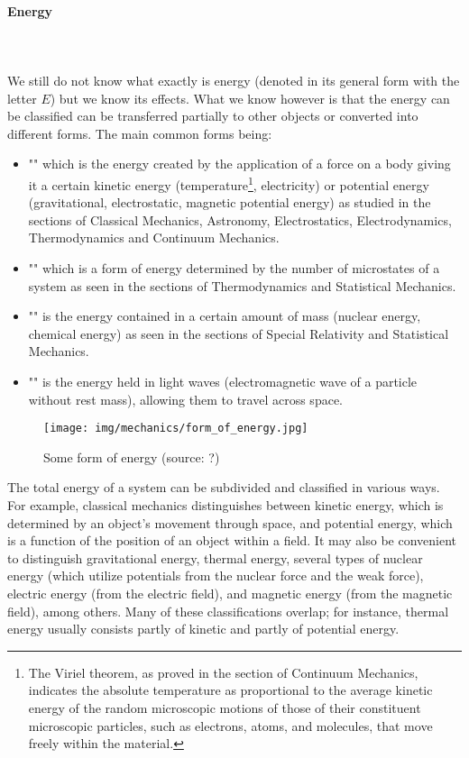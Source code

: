 	\pagebreak
	\paragraph{Energy}\mbox{}\\\\
	We still do not know what exactly is energy (denoted in its general form with the letter $E$) but we know its effects. What we know however is that the energy can be classified can be transferred partially to other objects or converted into different forms. The main common forms being:
	\begin{itemize}
		\item "" which is the energy created by the application of a force on a body giving it a certain kinetic energy (temperature\footnote{The Viriel theorem, as proved in the section of Continuum Mechanics, indicates the absolute temperature as proportional to the average kinetic energy of the random microscopic motions of those of their constituent microscopic particles, such as electrons, atoms, and molecules, that move freely within the material.}, electricity) or potential energy (gravitational, electrostatic, magnetic potential energy) as studied in the sections of Classical Mechanics, Astronomy, Electrostatics, Electrodynamics, Thermodynamics and Continuum Mechanics.

		\item "" which is a form of energy determined by the number of microstates of a system as seen in the sections of Thermodynamics and Statistical Mechanics.

		\item "" is the energy contained in a certain amount of mass (nuclear energy, chemical energy) as seen in the sections of Special Relativity and Statistical Mechanics.
		
		\item "" is the  energy held in light waves (electromagnetic wave of a particle without rest mass), allowing them to travel across space.
	\end{itemize} 
	\begin{figure}[H]
		\centering
		\texttt{[image: img/mechanics/form\_of\_energy.jpg]}
		\caption{Some form of energy (source: ?)}
	\end{figure}
	The total energy of a system can be subdivided and classified in various ways. For example, classical mechanics distinguishes between kinetic energy, which is determined by an object's movement through space, and potential energy, which is a function of the position of an object within a field. It may also be convenient to distinguish gravitational energy, thermal energy, several types of nuclear energy (which utilize potentials from the nuclear force and the weak force), electric energy (from the electric field), and magnetic energy (from the magnetic field), among others. Many of these classifications overlap; for instance, thermal energy usually consists partly of kinetic and partly of potential energy.

